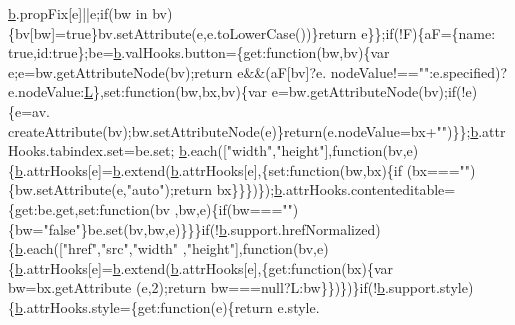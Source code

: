 \begin{DoxyCode}
      \hyperlink{a00039_aa4026ad5544b958e54ce5e106fa1c805}{b}.propFix[e]||e;\textcolor{keywordflow}{if}(bw in bv)\{bv[bw]=\textcolor{keyword}{true}\}bv.setAttribute(e,e.toLowerCase())\}\textcolor{keywordflow}{return} e\}\};\textcolor{keywordflow}{if}(!F)\{aF=\{name:\textcolor{keyword}{
      true},\textcolor{keywordtype}{id}:\textcolor{keyword}{true}\};be=\hyperlink{a00039_aa4026ad5544b958e54ce5e106fa1c805}{b}.valHooks.button=\{\textcolor{keyword}{get}:\textcolor{keyword}{function}(bw,bv)\{var e;e=bw.getAttributeNode(bv);\textcolor{keywordflow}{return} e&&(aF[bv]?e.
      nodeValue!==\textcolor{stringliteral}{""}:e.specified)?e.nodeValue:\hyperlink{a00039_a38ee4c0b5f4fe2a18d0c783af540d253}{L}\},set:\textcolor{keyword}{function}(bw,bx,bv)\{var e=bw.getAttributeNode(bv);\textcolor{keywordflow}{if}(!e)\{e=av.
      createAttribute(bv);bw.setAttributeNode(e)\}\textcolor{keywordflow}{return}(e.nodeValue=bx+\textcolor{stringliteral}{""})\}\};\hyperlink{a00039_aa4026ad5544b958e54ce5e106fa1c805}{b}.attrHooks.tabindex.set=be.set;
      \hyperlink{a00039_aa4026ad5544b958e54ce5e106fa1c805}{b}.each([\textcolor{stringliteral}{"width"},\textcolor{stringliteral}{"height"}],\textcolor{keyword}{function}(bv,e)\{\hyperlink{a00039_aa4026ad5544b958e54ce5e106fa1c805}{b}.attrHooks[e]=\hyperlink{a00039_aa4026ad5544b958e54ce5e106fa1c805}{b}.extend(\hyperlink{a00039_aa4026ad5544b958e54ce5e106fa1c805}{b}.attrHooks[e],\{set:function(bw,bx)\{if
      (bx===\textcolor{stringliteral}{""})\{bw.setAttribute(e,\textcolor{stringliteral}{"auto"});return bx\}\}\})\});\hyperlink{a00039_aa4026ad5544b958e54ce5e106fa1c805}{b}.attrHooks.contenteditable=\{\textcolor{keyword}{get}:be.get,set:\textcolor{keyword}{function}(bv
      ,bw,e)\{\textcolor{keywordflow}{if}(bw===\textcolor{stringliteral}{""})\{bw=\textcolor{stringliteral}{"false"}\}be.set(bv,bw,e)\}\}\}\textcolor{keywordflow}{if}(!\hyperlink{a00039_aa4026ad5544b958e54ce5e106fa1c805}{b}.support.hrefNormalized)\{\hyperlink{a00039_aa4026ad5544b958e54ce5e106fa1c805}{b}.each([\textcolor{stringliteral}{"href"},\textcolor{stringliteral}{"src"},\textcolor{stringliteral}{"width"}
      ,\textcolor{stringliteral}{"height"}],\textcolor{keyword}{function}(bv,e)\{\hyperlink{a00039_aa4026ad5544b958e54ce5e106fa1c805}{b}.attrHooks[e]=\hyperlink{a00039_aa4026ad5544b958e54ce5e106fa1c805}{b}.extend(\hyperlink{a00039_aa4026ad5544b958e54ce5e106fa1c805}{b}.attrHooks[e],\{get:function(bx)\{var bw=bx.getAttribute
      (e,2);return bw===null?L:bw\}\})\})\}\textcolor{keywordflow}{if}(!\hyperlink{a00039_aa4026ad5544b958e54ce5e106fa1c805}{b}.support.style)\{\hyperlink{a00039_aa4026ad5544b958e54ce5e106fa1c805}{b}.attrHooks.style=\{\textcolor{keyword}{get}:\textcolor{keyword}{function}(e)\{\textcolor{keywordflow}{return} e.style.

\end{DoxyCode}
